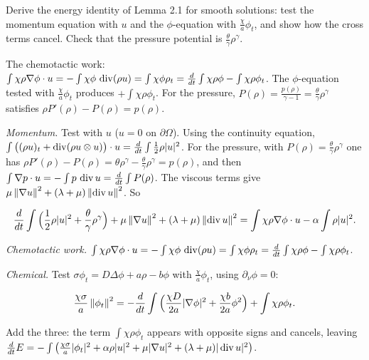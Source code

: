 \begin{exercise}
  Derive the energy identity of Lemma 2.1 for smooth solutions: test the momentum equation with $u$ and the $\phi$-equation with $\frac{\chi}{a}\phi_t$, and show how the cross terms cancel. Check that the pressure potential is $\frac\theta\gamma\rho^\gamma$.
  \begin{hint}
    The chemotactic work: $\int\chi\rho\nabla\phi\cdot u = -\int\chi\phi\,\operatorname{div}(\rho u) = \int\chi\phi\rho_t = \frac{d}{dt}\int\chi\rho\phi - \int\chi\rho\phi_t$. The $\phi$-equation tested with $\frac\chi a\phi_t$ produces $+\int\chi\rho\phi_t$. For the pressure, $P(\rho) = \frac{p(\rho)}{\gamma-1} = \frac\theta\gamma\rho^\gamma$ satisfies $\rho P'(\rho) - P(\rho) = p(\rho)$.
  \end{hint}
  \begin{solution}
    \emph{Momentum.} Test with $u$ ($u = 0$ on $\partial\Omega$). Using the continuity equation, $\int\big((\rho u)_t + \operatorname{div}(\rho u\otimes u)\big)\cdot u = \frac{d}{dt}\int\frac12\rho|u|^2$. For the pressure, with $P(\rho) = \frac{\theta}{\gamma}\rho^\gamma$ one has $\rho P'(\rho) - P(\rho) = \theta\rho^\gamma - \frac\theta\gamma\rho^\gamma = p(\rho)$, and then $\int\nabla p\cdot u = -\int p\,\operatorname{div} u = \frac{d}{dt}\int P(\rho)$. The viscous terms give $\mu\left\lVert \nabla u\right\rVert^2 + (\lambda+\mu)\left\lVert \operatorname{div} u\right\rVert^2$. So

    \[ \frac{d}{dt}\int\Big(\frac12\rho|u|^2 + \frac\theta\gamma\rho^\gamma\Big) + \mu\left\lVert \nabla u\right\rVert^2 + (\lambda+\mu)\left\lVert \operatorname{div} u\right\rVert^2
             = \int\chi\rho\nabla\phi\cdot u - \alpha\int\rho|u|^2. \]

    \emph{Chemotactic work.} $\int\chi\rho\nabla\phi\cdot u = -\int\chi\phi\,\operatorname{div}(\rho u) = \int\chi\phi\rho_t = \frac{d}{dt}\int\chi\rho\phi - \int\chi\rho\phi_t$.

    \emph{Chemical.} Test $\sigma\phi_t = D\Delta\phi + a\rho - b\phi$ with $\frac\chi a\phi_t$, using $\partial_\nu\phi = 0$:

    \[ \frac{\chi\sigma}{a}\left\lVert \phi_t\right\rVert^2 = -\frac{d}{dt}\int\Big(\frac{\chi D}{2a}|\nabla\phi|^2 + \frac{\chi b}{2a}\phi^2\Big) + \int\chi\rho\phi_t. \]

    Add the three: the term $\int\chi\rho\phi_t$ appears with opposite signs and cancels, leaving $\frac{d}{dt}E = -\int\big(\frac{\chi\sigma}{a}|\phi_t|^2 + \alpha\rho|u|^2 + \mu|\nabla u|^2 + (\lambda+\mu)|\operatorname{div} u|^2\big)$.
  \end{solution}
\end{exercise}

